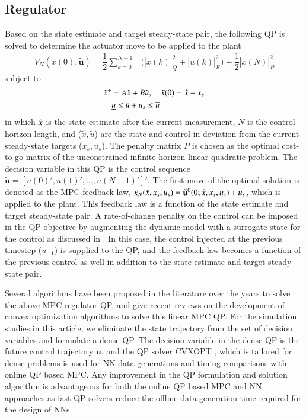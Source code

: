 \documentclass[preprint,5p, twocolumn, authoryear]{elsarticle}
\begin{document}
\subsection{Regulator}
Based on the state estimate and
target steady-state pair,
the following QP is solved to determine the 
actuator move to be applied to the plant
\begin{align} \label{eqn:regulator}
    V_N(\tilde{x}(0), \mathbf{\tilde{u}}) = \dfrac{1}{2}\sum_{k=0}^{N-1} & \Big(|\tilde{x}(k)|^2_Q  + |\tilde{u}(k)|^2_R \Big) + \dfrac{1}{2}|\tilde{x}(N)|^2_P
\end{align}
subject to 
\begin{align}
    \tilde{x}^+ &= A\tilde{x} + B\tilde{u}, \quad \tilde{x}(0) = \hat{x} - x_s \\
    &\underline{u} \leq \tilde{u} + u_s \leq \overline{u}
    \label{eqn:regulator_constraints}
\end{align}
in which $\hat{x}$ is the state estimate after the current measurement,
$N$ is the control 
horizon length, and
($\tilde{x}, \tilde{u}$) are the state and control 
in deviation from the current steady-state targets ($x_s, u_s$). 
The penalty matrix $P$ is chosen as the 
optimal cost-to-go matrix of the unconstrained infinite horizon 
linear quadratic problem.
The decision variable in this 
QP is the control sequence 
$\mathbf{\tilde{u}} = [\tilde{u}(0)', \tilde{u}(1)', ..., \tilde{u}(N-1)']'$.
The first move of the optimal solution is denoted 
as the MPC feedback law,
$\kappa_N(\hat{x}, x_s, u_s) = 
\mathbf{\tilde{u}}^0(0;\hat{x}, x_s, u_s) + u_s$, 
which is applied to the plant. This feedback law is a function of the 
state estimate and target steady-state pair. A rate-of-change 
penalty on the control can be imposed in the QP objective
by augmenting the dynamic model with a surrogate state 
for the control as discussed in \cite*{rao:rawlings:1999}. 
In this case, 
the control injected at the previous timestep
($u_{-1}$) is supplied to the QP, 
and the feedback law becomes a function of the previous control 
as well in addition to the state estimate
and target steady-state pair.

Several algorithms have been proposed in the literature over
the years to solve the above MPC regulator QP. 
\cite*{kouzoupis:frison:zanelli:diehl:2018} and
\cite*{wright:2019} give recent reviews on the development 
of convex optimization algorithms to solve this linear MPC QP.
For the simulation studies in this article, we eliminate the 
state trajectory from the set of decision variables  
and formulate a dense QP. The decision variable in the dense QP
is the future control trajectory $\mathbf{\tilde{u}}$, 
and the QP solver CVXOPT \citep*{vandenberghe:2010},
which is tailored for dense problems
is used for NN data generations and timing 
comparisons with online QP based MPC.
Any improvement in the QP formulation
and solution algorithm is advantageous
for both the online QP based MPC 
and NN approaches
as fast QP solvers reduce the 
offline data generation time required for the 
design of NNs.
\end{document}
